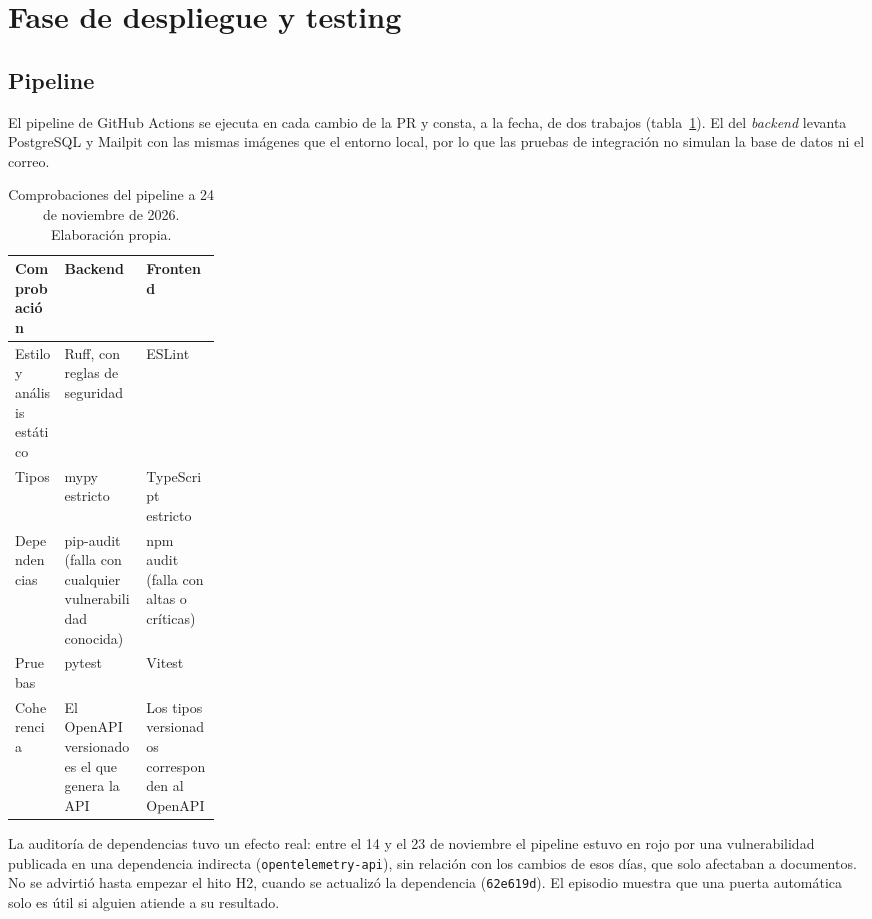 
\section{Fase de despliegue y testing}\label{sec:Testing}

\subsection{Pipeline}\label{subsec:Pipeline}

El pipeline de GitHub Actions se ejecuta en cada cambio de la PR y consta, a la fecha, de dos trabajos (tabla~\ref{tab:Pipeline}). El del \emph{backend} levanta PostgreSQL y Mailpit con las mismas imágenes que el entorno local, por lo que las pruebas de integración no simulan la base de datos ni el correo.

\begin{table}[htbp]
	\centering
	\small
	\caption{Comprobaciones del pipeline a 24 de noviembre de 2026. Elaboración propia.}
	\label{tab:Pipeline}
	\begin{tabularx}{\linewidth}{@{}>{\raggedright\arraybackslash}p{0.24\linewidth}>{\raggedright\arraybackslash}X>{\raggedright\arraybackslash}X@{}}
		\toprule
		\textbf{Comprobación} & \textbf{Backend} & \textbf{Frontend} \\
		\midrule
		Estilo y análisis estático & Ruff, con reglas de seguridad & ESLint \\
		Tipos & mypy estricto & TypeScript estricto \\
		Dependencias & pip-audit (falla con cualquier vulnerabilidad conocida) & npm audit (falla con altas o críticas) \\
		Pruebas & pytest & Vitest \\
		Coherencia & El OpenAPI versionado es el que genera la API & Los tipos versionados corresponden al OpenAPI \\
		\bottomrule
	\end{tabularx}
\end{table}

La auditoría de dependencias tuvo un efecto real: entre el 14 y el 23 de noviembre el pipeline estuvo en rojo por una vulnerabilidad publicada en una dependencia indirecta (\texttt{opentelemetry-api}), sin relación con los cambios de esos días, que solo afectaban a documentos. No se advirtió hasta empezar el hito H2, cuando se actualizó la dependencia (\texttt{62e619d}). El episodio muestra que una puerta automática solo es útil si alguien atiende a su resultado.

